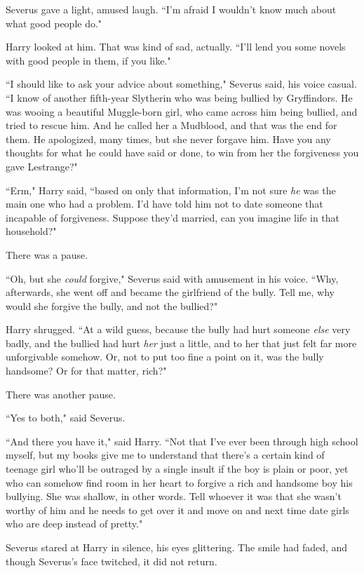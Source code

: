 Severus gave a light, amused laugh. ``I'm afraid I wouldn't know much about what good people do."

Harry looked at him. That was kind of sad, actually. ``I'll lend you some novels with good people in them, if you like."

``I should like to ask your advice about something," Severus said, his voice casual. ``I know of another fifth-year Slytherin who was being bullied by Gryffindors. He was wooing a beautiful Muggle-born girl, who came across him being bullied, and tried to rescue him. And he called her a Mudblood, and that was the end for them. He apologized, many times, but she never forgave him. Have you any thoughts for what he could have said or done, to win from her the forgiveness you gave Lestrange?"

``Erm," Harry said, ``based on only that information, I'm not sure \emph{he} was the main one who had a problem. I'd have told him not to date someone that incapable of forgiveness. Suppose they'd married, can you imagine life in that household?"

There was a pause.

``Oh, but she \emph{could} forgive," Severus said with amusement in his voice. ``Why, afterwards, she went off and became the girlfriend of the bully. Tell me, why would she forgive the bully, and not the bullied?"

Harry shrugged. ``At a wild guess, because the bully had hurt someone \emph{else} very badly, and the bullied had hurt \emph{her} just a little, and to her that just felt far more unforgivable somehow. Or, not to put too fine a point on it, was the bully handsome? Or for that matter, rich?"

There was another pause.

``Yes to both," said Severus.

``And there you have it," said Harry. ``Not that I've ever been through high school myself, but my books give me to understand that there's a certain kind of teenage girl who'll be outraged by a single insult if the boy is plain or poor, yet who can somehow find room in her heart to forgive a rich and handsome boy his bullying. She was shallow, in other words. Tell whoever it was that she wasn't worthy of him and he needs to get over it and move on and next time date girls who are deep instead of pretty."

Severus stared at Harry in silence, his eyes glittering. The smile had faded, and though Severus's face twitched, it did not return.

